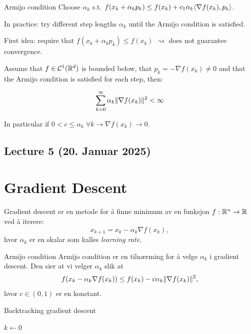 \begin{definition}{Armijo condition}{}
  Choose  \(\alpha_k\) s.t.  \(f(x_k + \alpha_k p_k) \leq f(x_k) + c_1 \alpha_k \langle\nabla f(x_k), p_k\rangle\).
\end{definition}

In practice: try different step lengths  \(\alpha_k\) until the Armijo condition is satisfied.

First idea: require that  \(f(x_k + \alpha_k p_k) \leq f(x_k)\)  \(\rightsquigarrow\) does not guarantee convergence.

\begin{lemma}{}{}
  Assume that  \(f \in \mathcal{C}^1(\mathbb{R}^d)\) is bounded below, that  \(p_k = - \nabla f(x_k) \neq 0\) and that the Armijo condition is satisfied for each step, then:

  \[
    \sum_{k=0}^{\infty} \alpha_k \lVert\nabla f(x_k)\rVert^2 < \infty
  \]

  In particular if  \(0 < c \leq \alpha_k \; \forall k \rightarrow \nabla f(x_k) \rightarrow 0\).
\end{lemma}



\subsection{Lecture 5 (20. Januar 2025)}

\section*{Gradient Descent}


Gradient descent er en metode for å finne minimum av en funksjon  \(f: \mathbb{R}^n \to \mathbb{R}\) ved å iterere:
\[
  x_{k+1} = x_k - \alpha_k \nabla f(x_k),
\]
hvor  \(\alpha_k\) er en skalar som kalles \emph{learning rate}.

\begin{remark}{Armijo condition}{}
  Armijo condition er en tilnærming for å velge  \(\alpha_k\) i gradient descent. Den sier at vi velger  \(\alpha_k\) slik at
  \[
    f(x_k - \alpha_k \nabla f(x_k)) \leq f(x_k) - c \alpha_k \lVert\nabla f(x_k)\rVert^2,
  \]
  hvor  \(c \in (0, 1)\) er en konstant.
\end{remark}


\begin{algorithm}
  \caption{Backtracking gradient descent}
  \SetAlgoLined
  \(k \gets 0\)\;
\end{algorithm}


